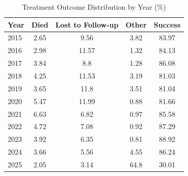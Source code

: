 \begin{table}[htbp]

\caption{Treatment Outcome Distribution by Year (\%)}
\label{tab:outcome_trends_by_year}
\centering
\begin{tabular}{lcccc}

\toprule

Year & Died & Lost to Follow-up & Other & Success \\

\midrule

2015 & 2.65 & 9.56 & 3.82 & 83.97 \\
2016 & 2.98 & 11.57 & 1.32 & 84.13 \\
2017 & 3.84 & 8.8 & 1.28 & 86.08 \\
2018 & 4.25 & 11.53 & 3.19 & 81.03 \\
2019 & 3.65 & 11.8 & 3.51 & 81.04 \\
2020 & 5.47 & 11.99 & 0.88 & 81.66 \\
2021 & 6.63 & 6.82 & 0.97 & 85.58 \\
2022 & 4.72 & 7.08 & 0.92 & 87.29 \\
2023 & 3.92 & 6.35 & 0.81 & 88.92 \\
2024 & 3.66 & 5.56 & 4.55 & 86.24 \\
2025 & 2.05 & 3.14 & 64.8 & 30.01 \\

\bottomrule

\end{tabular}

\end{table}